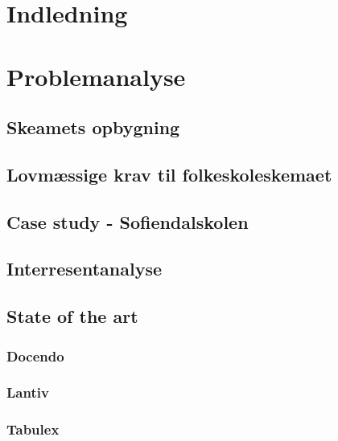 \section{Indledning}
  

\section{Problemanalyse}
  

  \subsection{Skeamets opbygning}
    

  \subsection{Lovmæssige krav til folkeskoleskemaet}
    

  \subsection{Case study - Sofiendalskolen}
    

  \subsection{Interresentanalyse}
    
    
  \subsection{State of the art}
    
	
    \subsubsection{Docendo}
     
     
    \subsubsection{Lantiv}
     
     
    \subsubsection{Tabulex}
     

